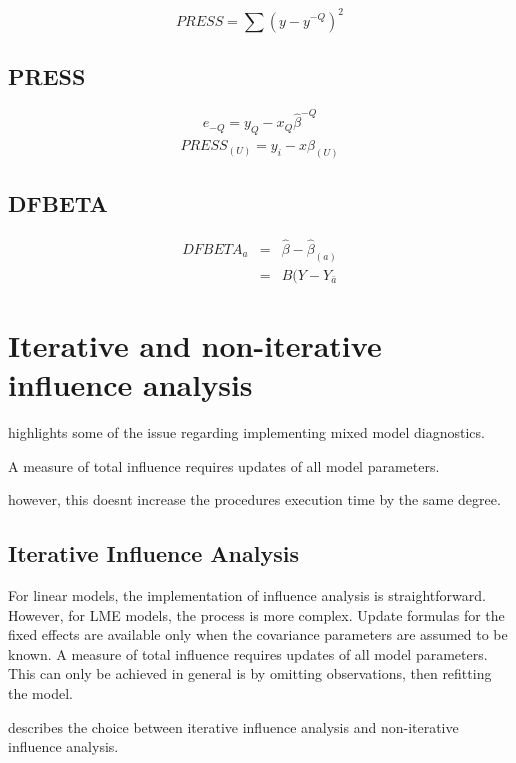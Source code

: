 \documentclass[12pt, a4paper]{report}
\theoremstyle{plain}
\theoremstyle{definition}
\theoremstyle{remark}
\begin{document}
\begin{equation}
PRESS = \sum(y-y^{-Q})^2
\end{equation}

\subsection{PRESS}
\begin{equation}
e_{-Q} = y_{Q} - x_{Q}\hat{\beta}^{-Q}
\end{equation}
\begin{equation}
PRESS_{(U)} = y_{i} - x\hat{\beta}_{(U)}
\end{equation}

\subsection{DFBETA} %
\begin{eqnarray}
DFBETA_{a} &=& \hat{\beta} - \hat{\beta}_{(a)} \\
&=& B(Y-Y_{\bar{a}}
\end{eqnarray}
\newpage
\section{Iterative and non-iterative influence analysis} %
\citet{schabenberger} highlights some of the issue regarding implementing mixed model diagnostics.

A measure of total influence requires updates of all model parameters.

however, this doesnt increase the procedures execution time by the same degree.
\subsection{Iterative Influence Analysis}

For linear models, the implementation of influence analysis is straightforward.
However, for LME models, the process is more complex. Update formulas for the fixed effects are available only when the covariance parameters are assumed to be known. A measure of total influence requires updates of all model parameters.
This can only be achieved in general is by omitting observations, then refitting the model.

\citet{schabenberger} describes the choice between  iterative influence analysis and  non-iterative influence analysis.
\end{document}
